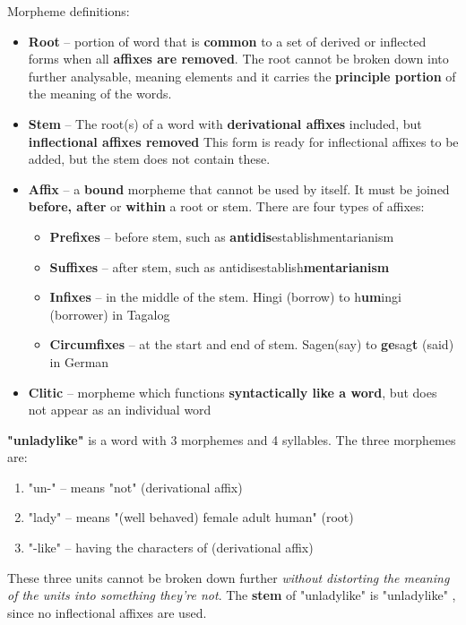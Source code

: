 \documentclass{article}
\begin{document}
Morpheme definitions:
\begin{itemize}
	\item \textbf{Root} -- portion of word that is \textbf{common} to a set of derived or inflected forms when all \textbf{affixes are removed}. The root cannot be broken down into further analysable, meaning elements and it carries the \textbf{principle portion} of the meaning of the words.
	\item \textbf{Stem} -- The root(s) of a word with \textbf{derivational affixes} included, but \textbf{inflectional affixes removed} This form is ready for inflectional affixes to be added, but the stem does not contain these.
	\item \textbf{Affix} -- a \textbf{bound} morpheme that cannot be used by itself. It must be joined \textbf{before, after} or \textbf{within} a root or stem. There are four types of affixes:
	\begin{itemize}
		\item \textbf{Prefixes} -- before stem, such as \textbf{antidis}establishmentarianism
		\item \textbf{Suffixes} -- after stem, such as antidisestablish\textbf{mentarianism}
		\item \textbf{Infixes} -- in the middle of the stem. Hingi (borrow) to h\textbf{um}ingi (borrower) in Tagalog
		\item \textbf{Circumfixes} -- at the start and end of stem. Sagen(say) to \textbf{ge}sag\textbf{t} (said) in German
	\end{itemize}
	\item \textbf{Clitic} -- morpheme which functions \textbf{syntactically like a word}, but does not appear as an individual word
\end{itemize}

\textbf{"unladylike"} is a word with 3 morphemes and 4 syllables. The three morphemes are:
\begin{enumerate}
	\item "un-" -- means "not" (derivational affix)
	\item "lady" -- means "(well behaved) female adult human" (root)
	\item "-like" -- having the characters of (derivational affix)
\end{enumerate}
These three units cannot be broken down further \textit{without distorting the meaning of the units into something they're not}. The \textbf{stem} of "unladylike" is "unladylike" , since no inflectional affixes are used.
\end{document}
